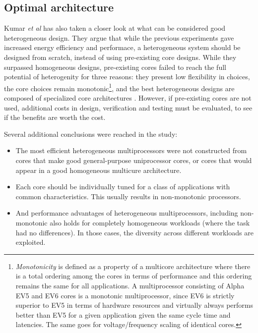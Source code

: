 \subsection{Optimal architecture}
\label{subsec:rw_arch}
Kumar \textit{et al}\cite{heterogeneous-arch} has also taken a closer look at what can be considered good heterogeneous design.
They argue that while the previous experiments gave increased energy efficiency and performace, a heterogeneous system should be designed from scratch, instead of using pre-existing core designs.
While they surpassed homogeneous designs, pre-existing cores failed to reach the full potential of heterogenity for three reasons: they present low flexibility in choices, the core choices remain monotonic\footnote{\textit{Monotonicity} is defined as a property of a multicore architecture where there is a total ordering among the cores in terms of performance and this ordering remains the same for all applications. A multiprocessor consisting of Alpha EV5 and EV6 cores is a monotonic multiprocessor, since EV6 is strictly superior to EV5 in terms of hardware resources and virtually always performs better than EV5 for a given application given the same cycle time and latencies. The same goes for voltage/frequency scaling of identical cores.}, and the best heterogeneous designs are composed of specialized core architectures \cite{heterogeneous-arch}.
However, if pre-existing cores are not used, additional costs in design, verification and testing must be evaluated, to see if the benefits are worth the cost.

Several additional conclusions were reached in the study:
\begin{itemize}
\item The most efficient heterogeneous multiprocessors were not constructed from cores that make good general-purpose uniprocessor cores, or cores that would appear in a good homogeneous multicure architecture.
\item Each core should be individually tuned for a class of applications with common characteristics.
      This usually results in non-monotonic processors.
\item And performance advantages of heterogeneous multiprocessors, including non-monotonic also holds for completely homogeneous workloads (where the task had no differences).
    In those cases, the diversity across different workloads are exploited.
\end{itemize}

